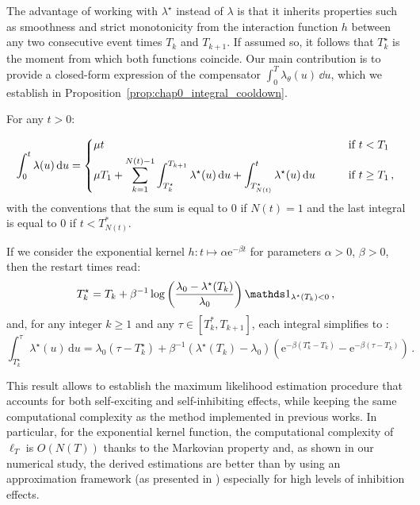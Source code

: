     The advantage of working with $\lambda^\star$ instead of $\lambda$ is that it inherits properties such as smoothness and strict monotonicity from the interaction function $h$ between any two consecutive event times $T_k$ and $T_{k+1}$.
    If assumed so, it follows that $T_k^\star$ is the moment from which both functions coincide.
    Our main contribution is to provide a closed-form expression of the compensator $\int_{0}^{T}{\lambda_\theta(u)\,\dd u}$, which we establish in Proposition~\ref{prop:chap0_integral_cooldown}.
    \begin{proposition}\label{prop:chap0_integral_cooldown}
      For any $t>0$:
      
      \begin{equation}\label{eq:chap0_compensator_general}
      \int_{0}^{t}{\lambda(u)\,{\mathrm{d}} u} =
      \begin{dcases}
          \mu t &\text{\qquad if $t<T_1$}\\
          \mu T_1 + \sum_{k=1}^{{N(t)-1}}{\int_{T_{k}^\star}^{T_{k+1}}{\lambda^\star(u)\,\mathrm{d}u}} + \int_{T_{N(t)}^\star}^{t}{\lambda^\star(u)\,\mathrm{d}u} &\text{\qquad if $t\geq T_1$}\,,
      \end{dcases}
      \end{equation}
      with the conventions that the sum is equal to $0$ if ${N(t)} = 1$ and the last integral is equal to $0$ if $t < T_{N(t)}^*$.

      If we consider the exponential kernel $h\colon t\mapsto \alpha \mathrm{e}^{-\beta t}$ for parameters $\alpha > 0$, $\beta > 0$, then the restart times read:
      \[
          T_k^\star = T_k + \beta^{-1} \log \left({\frac{\lambda_0 - \lambda^\star(T_k)}{\lambda_0}} \right) \II_{\lambda^\star(T_k) < 0}\,,
      \]
      and, for any integer $k\geq 1$ and any $\tau \in [T_{k}^*, T_{k+1}]$, each integral simplifies to 
      :
      \[
          \int_{T_{k}^\star}^{\tau}{\lambda^\star(u)\,\mathrm{d}u}
          = \lambda_0(\tau - T_{k}^\star) + \beta^{-1} (\lambda^\star(T_{k}) - \lambda_0) (\mathrm{e}^{-\beta(T_{k}^\star-T_{k})}-\mathrm{e}^{-\beta(\tau-T_{k})})\,.
      \]
      \end{proposition}

    This result allows to establish the maximum likelihood estimation procedure that accounts for both self-exciting and self-inhibiting effects, while keeping the same computational complexity as the method implemented in previous works. 
    In particular, for the exponential kernel function, the computational complexity of $\ell_T$ is $O(N(T))$ thanks to the Markovian property and, as shown in our numerical study, the derived estimations are better than by using an approximation framework (as presented in \textcite{Lemonnier2014}) especially for high levels of inhibition effects.

